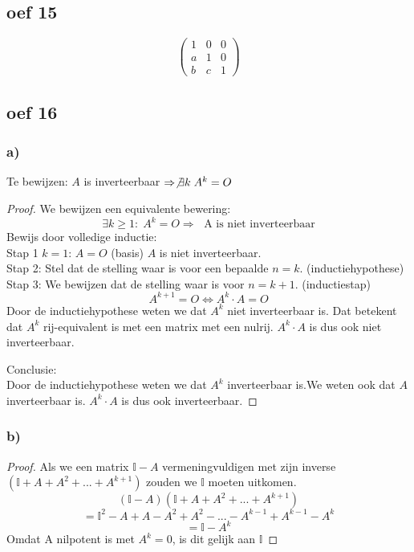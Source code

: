 \documentclass[10pt,a4paper]{article}
\begin{document}
\subsection*{oef 15}
\[
\begin{pmatrix}
1 & 0 & 0\\
a & 1 & 0\\
b & c & 1
\end{pmatrix}
\]

\subsection*{oef 16}
\subsubsection*{a)}
Te bewijzen: $A$ is inverteerbaar $\Rightarrow \not \exists k\; A^k=O$ 
\begin{proof}
We bewijzen een equivalente bewering:
\[
\exists k\ge 1:\;A^k=O \Rightarrow\; \text{ A is niet inverteerbaar}
\]
Bewijs door volledige inductie:\\
Stap 1 $k=1$: $A=O$ (basis)
$A$ is niet inverteerbaar.\\
Stap 2: Stel dat de stelling waar is voor een bepaalde $n=k$. (inductiehypothese)\\

Stap 3: We bewijzen dat de stelling waar is voor $n=k+1$. (inductiestap)\\
\[ A^{k+1}=O \Leftrightarrow A^{k}\cdot A=O \]
Door de inductiehypothese weten we dat $A^{k}$ niet inverteerbaar is. Dat betekent dat $A^{k}$ rij-equivalent is met een matrix met een nulrij. $A^{k} \cdot A$ is dus ook niet inverteerbaar.

Conclusie:\\
Door de inductiehypothese weten we dat $A^{k}$ inverteerbaar is.We weten ook dat $A$ inverteerbaar is. $A^{k} \cdot A$ is dus ook inverteerbaar.

\end{proof}

\subsubsection*{b)}
\begin{proof}
Als we een matrix $\mathbb{I}-A$ vermeningvuldigen met zijn inverse $(\mathbb{I}+A+A^2+...+A^{k+1})$ zouden we $\mathbb{I}$ moeten uitkomen.
\[ (\mathbb{I}-A)(\mathbb{I}+A+A^2+...+A^{k+1}) \]
\[ = \mathbb{I}^{2} -A+A-A^{2}+A^{2}-...-A^{k-1}+A^{k-1}-A^{k}\]
\[ = \mathbb{I}-A^{k}\]
Omdat A nilpotent is met $A^k=0$, is dit gelijk aan $\mathbb{I}$
\end{proof}
\end{document}
